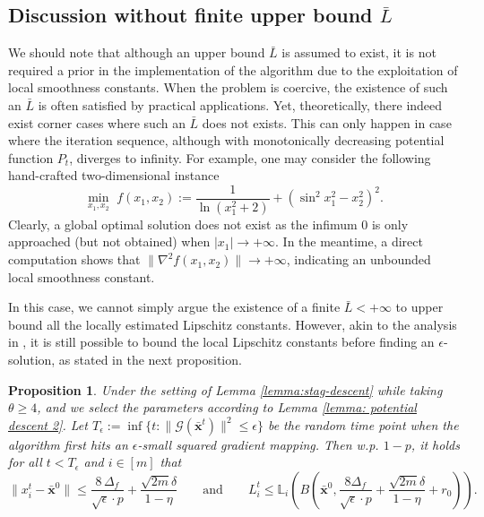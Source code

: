 \documentclass{article}
\newtheorem{proposition}[theorem]{Proposition}
\newcommand{\bL}{\mathbb{L}}
\newcommand{\bbxt}{\bar{\mathbf{x}}^t}
\newcommand{\bx}{\mathbf{x}}
\begin{document}
\subsection{Discussion without finite upper bound $\bar{L}$}

We should note that although an upper bound $\bar{L}$ is assumed to exist, it is not required a prior in the implementation of the algorithm due to the exploitation of local smoothness constants. When the problem is coercive, the existence of such an $\bar{L}$ is often satisfied by practical applications. Yet, theoretically, there indeed exist corner cases where such an $\bar{L}$ does not exists. This can only happen in  case where the iteration sequence, although with monotonically decreasing potential function $P_t$, diverges to infinity. For example, one may consider the following hand-crafted two-dimensional instance 
$$\min_{x_1,x_2}\,\, f(x_1,x_2):=\frac{1}{\ln (x_1^2+2)} + (\sin^2 x_1^2 - x_2^2)^2.$$
Clearly, a global optimal solution does not exist as the infimum $0$ is only approached (but not obtained) when $|x_1|\to+\infty$. In the meantime, a direct computation shows that $\|\nabla^2f(x_1,x_2)\|\to+\infty$, indicating an unbounded local smoothness constant. 


In this case, we cannot simply argue the existence of a finite $\bar{L}<+\infty$ to upper bound all the locally estimated Lipschitz constants. However, akin to the analysis in \cite[Section 4]{zhang2025stochastic}, it is still possible to bound the local Lipschitz constants before finding an  $\epsilon$-solution, as stated in the next proposition.  
\begin{proposition}
\label{thm:bounded-region}
Under the setting of Lemma \ref{lemma:stag-descent} while taking $\theta\geq4$, and we select the parameters according to Lemma \ref{lemma: potential descent 2}. Let $T_\epsilon := \inf\{ t : \|\mathcal{G}(\bbxt)\|^2 \le \epsilon\}$
be the random time point when the algorithm first hits an $\epsilon$-small squared gradient mapping. Then w.p. $1-p$, it holds for all $t<T_\epsilon$ and $i\in[m]$ that 
$$\big\|x_i^t-\bar{\bx}^{0}\big\|
\le
\frac{8\,\Delta_f}{\sqrt{\epsilon}\cdot p}+\frac{\sqrt{2m}\delta}{1-\eta}\qquad\mbox{and}\qquad L_i^t
\leq  
\bL_i\left(B\left(\bar{\bx}^0,\frac{8\Delta_f}{\sqrt{\epsilon}\cdot p} + \frac{\sqrt{2m}\delta}{1-\eta}+r_0\right)\right).$$ 
\end{proposition}
\end{document}
